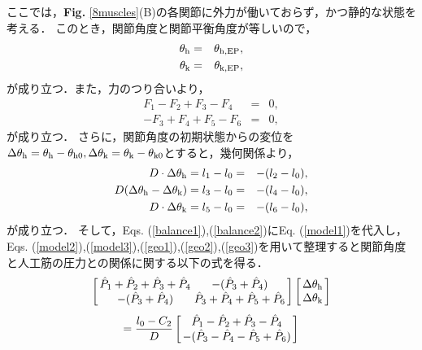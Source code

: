ここでは，{\bf Fig. }\ref{8muscles}(B)の各関節に外力が働いておらず，かつ静的な状態を考える．
このとき，関節角度と関節平衡角度が等しいので，
\begin{eqnarray}
 \label{Eangle1}
 \theta_{\rm h}&=&\theta_{\rm h,EP},\\
 \label{Eangle2}
 \theta_{\rm k}&=&\theta_{\rm k,EP},
\end{eqnarray}
が成り立つ．また，力のつり合いより，
\begin{eqnarray}
 \label{balance1}
 F_1-F_2+F_3-F_4&=&0,\\
 \label{balance2}
 -F_3+F_4+F_5-F_6&=&0,
\end{eqnarray}
が成り立つ．
さらに，関節角度の初期状態からの変位を$\Delta\theta_{\rm h}=\theta_{\rm h}-\theta_{{\rm h}0},\Delta\theta_{\rm k}=\theta_{\rm k}-\theta_{{\rm k}0}$とすると，幾何関係より，
\begin{eqnarray}
 \label{geo1}
 D\cdot\Delta\theta_{\rm h}&=l_1-l_0=&-(l_2-l_0),\\
 \label{geo2}
 D(\Delta\theta_{\rm h}-\Delta\theta_{\rm k})&=l_3-l_0=&-(l_4-l_0),\\
 \label{geo3}
 D\cdot\Delta\theta_{\rm k}&=l_5-l_0=&-(l_6-l_0),
\end{eqnarray}
が成り立つ．
そして，Eqs. (\ref{balance1}),(\ref{balance2})にEq. (\ref{model1})を代入し，Eqs. (\ref{model2}),(\ref{model3}),(\ref{geo1}),(\ref{geo2}),(\ref{geo3})を用いて整理すると関節角度と人工筋の圧力との関係に関する以下の式を得る．
\begin{eqnarray*}
 \arraycolsep=1.5pt
 \label{mat1}
 \left[
  \begin{array}{cc}
   \hat{P}_1+\hat{P}_2+\hat{P}_3+\hat{P}_4 & -(\hat{P}_3+\hat{P}_4) \\
   -(\hat{P}_3+\hat{P}_4) & \hat{P}_3+\hat{P}_4+\hat{P}_5+\hat{P}_6
  \end{array}
 \right]
 \left[
  \begin{array}{c}
   \Delta\theta_{\rm h} \\
   \Delta\theta_{\rm k}
  \end{array}
 \right]
\end{eqnarray*}
\vspace{-1.em}
\begin{eqnarray}
 \arraycolsep=1.5pt
 \label{mat2}
 =\frac{l_0-C_2}{D}
 \left[
  \begin{array}{c}
   \hat{P}_1-\hat{P}_2+\hat{P}_3-\hat{P}_4 \\
   -(\hat{P}_3-\hat{P}_4-\hat{P}_5+\hat{P}_6)
  \end{array}
 \right]
\end{eqnarray}

